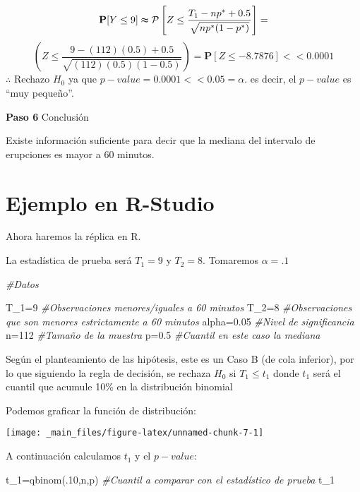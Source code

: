 \documentclass[
  a4paper,
  oneside,
  openany]{book}
\newenvironment{Shaded}{\begin{snugshade}}{\end{snugshade}}
\newcommand{\CommentTok}[1]{\textcolor[rgb]{0.56,0.35,0.01}{\textit{#1}}}
\newcommand{\DecValTok}[1]{\textcolor[rgb]{0.00,0.00,0.81}{#1}}
\newcommand{\FloatTok}[1]{\textcolor[rgb]{0.00,0.00,0.81}{#1}}
\newcommand{\FunctionTok}[1]{\textcolor[rgb]{0.00,0.00,0.00}{#1}}
\newcommand{\NormalTok}[1]{#1}
\newcommand{\OtherTok}[1]{\textcolor[rgb]{0.56,0.35,0.01}{#1}}
\begin{document}
\[\mathbf{P}[Y\leq 9] \thickapprox \mathcal{P} \left[Z\leq\frac{T_{1}-np^*+0.5}{\sqrt{np^*(1-p^*)}}\right]=\]
\[\left(Z\leq\frac{9-(112)(0.5)+0.5}{\sqrt{(112)(0.5)(1-0.5)}}\right)=\mathbf{P}[Z\leq -8.7876] < < 0.0001\]
\(\therefore\) Rechazo \(H_0\) ya que \(p-value=0.0001<<0.05=\alpha.\) es decir, el \(p-value\) es ``muy pequeño''.

\textbf{Paso 6} Conclusión

Existe información suficiente para decir que la mediana del intervalo de erupciones es mayor a 60 minutos.

\hypertarget{ejemplo-en-r-studio-1}{%
\section{Ejemplo en R-Studio}\label{ejemplo-en-r-studio-1}}

Ahora haremos la réplica en R.

La estadística de prueba será \(T_1=9\) y \(T_2=8\). Tomaremos \(\alpha=.1\)

\begin{Shaded}
\begin{Highlighting}[]
\CommentTok{\#Datos}

\NormalTok{T\_1}\OtherTok{=}\DecValTok{9}         \CommentTok{\#Observaciones menores/iguales a 60 minutos}
\NormalTok{T\_2}\OtherTok{=}\DecValTok{8}         \CommentTok{\#Observaciones que son menores estrictamente a 60 minutos}
\NormalTok{alpha}\OtherTok{=}\FloatTok{0.05}    \CommentTok{\#Nivel de significancia}
\NormalTok{n}\OtherTok{=}\DecValTok{112}         \CommentTok{\#Tamaño de la muestra}
\NormalTok{p}\OtherTok{=}\FloatTok{0.5}         \CommentTok{\#Cuantil en este caso la mediana }
\end{Highlighting}
\end{Shaded}

Según el planteamiento de las hipótesis, este es un Caso B (de cola inferior), por lo que siguiendo la regla de decisión, se rechaza \(H_0\) si \(T_1\leq t_1\) donde \(t_1\) será el cuantil que acumule 10\% en la distribución binomial

Podemos graficar la función de distribución:

\begin{center}\texttt{[image: \_main\_files/figure-latex/unnamed-chunk-7-1]} \end{center}

A continuación calculamos \(t_1\) y el \(p-value\):

\begin{Shaded}
\begin{Highlighting}[]
\NormalTok{t\_1}\OtherTok{=}\FunctionTok{qbinom}\NormalTok{(.}\DecValTok{10}\NormalTok{,n,p)        }\CommentTok{\#Cuantil a comparar con el estadístico de prueba}
\NormalTok{t\_1}
\end{Highlighting}
\end{Shaded}
\end{document}
